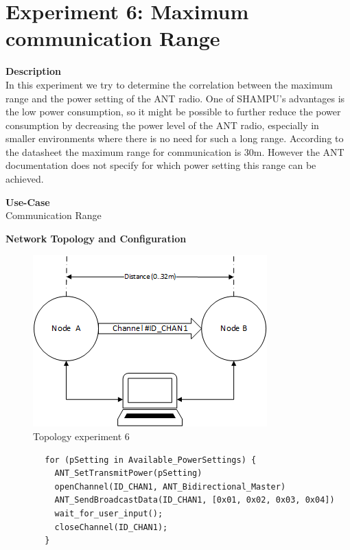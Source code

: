 \section{Experiment 6: Maximum communication Range}
\begin{description} 
	\item{\textbf{Description}} \hfill \\  In this experiment we try to determine the correlation between the maximum range and the power setting of the ANT radio. One of SHAMPU's advantages is the low power consumption, so it might be possible to further reduce the power consumption by decreasing the power level of the ANT radio, especially in smaller environments where there is no need for such a long range. According to the datasheet the maximum range for communication is 30m. However the ANT documentation does not specify for which power setting this range can be achieved. 

	\item{\textbf{Use-Case}} \hfill \\ Communication Range		
	\item{\textbf{Network Topology and Configuration}} \hfill \\ 
	\begin{figure}[H]
		\centering
		\includegraphics[scale=1]{./pics/exp6_topo.png}
		\caption{Topology experiment 6}
	\end{figure}
	
	\begin{code}[H]
		\begin{verbatim}
		for (pSetting in Available_PowerSettings) {
		  ANT_SetTransmitPower(pSetting)
		  openChannel(ID_CHAN1, ANT_Bidirectional_Master)
		  ANT_SendBroadcastData(ID_CHAN1, [0x01, 0x02, 0x03, 0x04])
		  wait_for_user_input();
		  closeChannel(ID_CHAN1);
		}
		\end{verbatim}
		\caption{maximum communication range (Master)}\label{lst:mExp6}
	\end{code}
	

\end{description}
